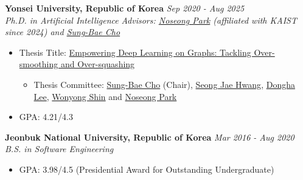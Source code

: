 \documentclass[10pt]{article}
\newenvironment{changemargin}[2]{
  \begin{list}{}{
    \setlength{\topsep}{0pt}
    \setlength{\leftmargin}{#1}
    \setlength{\rightmargin}{#2}
    \setlength{\listparindent}{\parindent}
    \setlength{\itemindent}{\parindent}
    \setlength{\parsep}{\parskip}
  }
  \item[]}{\end{list}
}
\newenvironment{body} {
	\vspace*{-16pt}
	\begin{changemargin}{-0.25in}{-0.5in}
  }
	{\end{changemargin}
}
\begin{document}
\begin{body}
	\vspace{14pt}
	\textbf{Yonsei University, Republic of Korea} \hfill \emph{Sep 2020 -  Aug 2025} \\
	\emph{Ph.D. in Artificial Intelligence} \hfill \emph{Advisors: \href{https://scholar.google.com/citations?user=VSuM3gYAAAAJ&hl=en}{Noseong Park} (affiliated with KAIST since 2024) and \href{https://scholar.google.com/citations?user=px5LGgMAAAAJ&hl=en}{Sung-Bae Cho}}\\
    \begin{itemize}
        \item Thesis Title: {\href{https://www.jeongwhanchoi.com/assets/thesis.pdf}{Empowering Deep Learning on Graphs: Tackling Over-smoothing and Over-squashing}}
        \begin{itemize}
            \item Thesis Committee: \href{https://scholar.google.com/citations?user=px5LGgMAAAAJ&hl=en}{Sung-Bae Cho} (Chair), \href{https://scholar.google.com/citations?user=d4WCQbUAAAAJ&hl=en}{Seong Jae Hwang}, \href{https://scholar.google.com/citations?user=driVwKwAAAAJ&hl=en}{Dongha Lee}, \href{https://scholar.google.com/citations?user=PwOjMLEAAAAJ&hl=en}{Wonyong Shin} and \href{https://scholar.google.com/citations?user=VSuM3gYAAAAJ&hl=en}{Noseong Park}
        \end{itemize}
        \item GPA: 4.21/4.3
    \end{itemize}
\end{body}

\begin{body}
	\vspace{14pt}
	\textbf{Jeonbuk National University, Republic of Korea} \hfill \emph{Mar 2016 -  Aug 2020} \\
	\emph{B.S. in Software Engineering}\\
	\begin{itemize} \itemsep -0pt  %
    \item GPA: 3.98/4.5 (Presidential Award for Outstanding Undergraduate)
	\end{itemize}
\end{body}

\medskip


\end{document}

